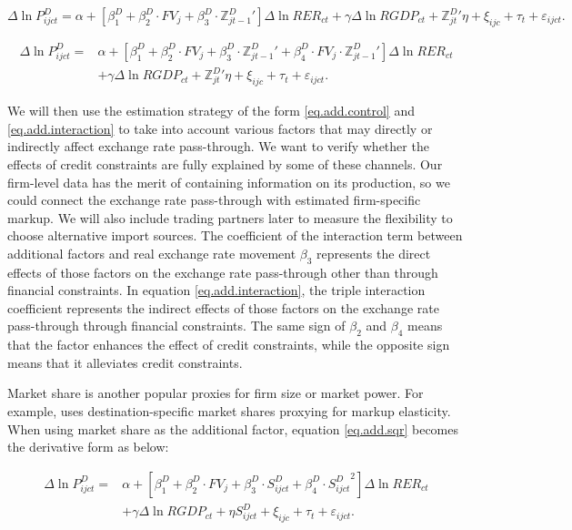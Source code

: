 \documentclass[12pt]{article}
\begin{document}
\begin{equation}
	\Delta \ln P^{D}_{ijct}=\alpha+[\beta^D_{1}+ \beta^D_{2} \cdot FV_{j}+\beta^D_{3} \cdot {\mathbb{Z}^{D}_{jt-1}}'] \Delta \ln RER_{ct} +\gamma \Delta \ln RGDP_{ct}+ {\mathbb{Z}^{D}_{jt}}' \eta+\xi_{ijc}+\tau_{t} +\varepsilon_{ijct}.
	\label{eq.add.control}
\end{equation}

\begin{equation}
	\begin{aligned}
	\Delta \ln P^{D}_{ijct}=&\alpha+[\beta^D_{1}+ \beta^D_{2} \cdot FV_{j}+\beta^D_{3} \cdot {\mathbb{Z}^{D}_{jt-1}}'+\beta^D_{4} \cdot FV_{j} \cdot {\mathbb{Z}^{D}_{jt-1}}'] \Delta \ln RER_{ct} \\ &+\gamma \Delta \ln RGDP_{ct}+ {\mathbb{Z}^{D}_{jt}}' \eta+\xi_{ijc}+\tau_{t} +\varepsilon_{ijct}.
	\end{aligned}	
	\label{eq.add.interaction}
\end{equation}

We will then use the estimation strategy of the form \ref{eq.add.control} and \ref{eq.add.interaction} to take into account various factors that may directly or indirectly affect exchange rate pass-through. We want to verify whether the effects of credit constraints are fully explained by some of these channels. Our firm-level data has the merit of containing information on its production, so we could connect the exchange rate pass-through with estimated firm-specific markup. We will also include trading partners later to measure the flexibility to choose alternative import sources. The coefficient of the interaction term between additional factors and real exchange rate movement $\beta_3$ represents the direct effects of those factors on the exchange rate pass-through other than through financial constraints. In equation \ref{eq.add.interaction}, the triple interaction coefficient represents the indirect effects of those factors on the exchange rate pass-through through financial constraints. The same sign of $\beta_2$ and $\beta_4$ means that the factor enhances the effect of credit constraints, while the opposite sign means that it alleviates credit constraints.

Market share is another popular proxies for firm size or market power. For example, \cite{aik2014} uses destination-specific market shares proxying for markup elasticity. When using market share as the additional factor, equation \ref{eq.add.sqr} becomes the derivative form as below:

\begin{equation}
	\begin{aligned}
	\Delta \ln P^{D}_{ijct}=&\alpha+[\beta^D_{1}+ \beta^D_{2} \cdot FV_{j}+\beta^D_{3} \cdot S^{D}_{ijct}+\beta^D_4 \cdot {S^{D}_{ijct}}^2] \Delta \ln RER_{ct} \\
	&+\gamma \Delta \ln RGDP_{ct}+ \eta S^{D}_{ijct}+\xi_{ijc}+\tau_{t} +\varepsilon_{ijct}.
	\end{aligned}
	\label{eq.add.sqr}
\end{equation}
\end{document}
